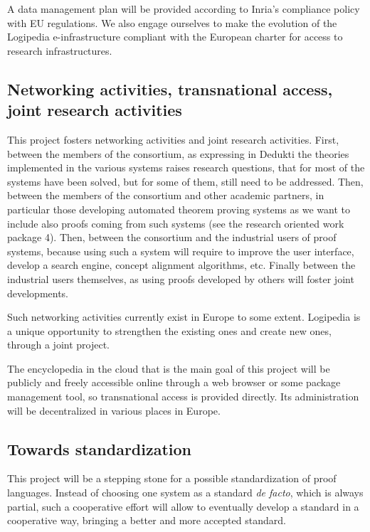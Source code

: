 A data management plan will be provided according to Inria’s
compliance policy with EU regulations. We also engage ourselves to
make the evolution of the {\sc Logipedia} e-infrastructure compliant
with the European charter for access to research infrastructures.

\subsection{Networking activities, transnational access, joint
  research activities}

This project fosters networking activities and joint research
activities. First, between the members of the consortium, as
expressing in {\sc Dedukti} the theories implemented in the various
systems raises research questions, that for most of the systems have
been solved, but for some of them, still need to be addressed.  Then,
between the members of the consortium and other academic partners, in
particular those developing automated theorem proving systems as we
want to include also proofs coming from such systems (see the research
oriented work package 4). Then, between the consortium and the
industrial users of proof systems, because using such a system will
require to improve the user interface, develop a search engine,
concept alignment algorithms, etc.  Finally between the industrial
users themselves, as using proofs developed by others will foster joint
developments.

Such networking activities currently exist in Europe to some extent. {\sc
  Logipedia} is a unique opportunity to strengthen the existing ones and create new ones, through a
joint project.

The encyclopedia in the cloud that is the main goal of this project
will be publicly and freely accessible online through a web browser or some package management tool, so transnational
access is provided directly. Its administration will be decentralized
in various places in Europe.

\subsection{Towards standardization}
This project will be a stepping stone for a possible standardization
of proof languages. Instead of choosing one system as a standard {\em
de facto}, which is always partial, such a cooperative effort will
allow to eventually develop a standard in a cooperative way, bringing
a better and more accepted standard.

